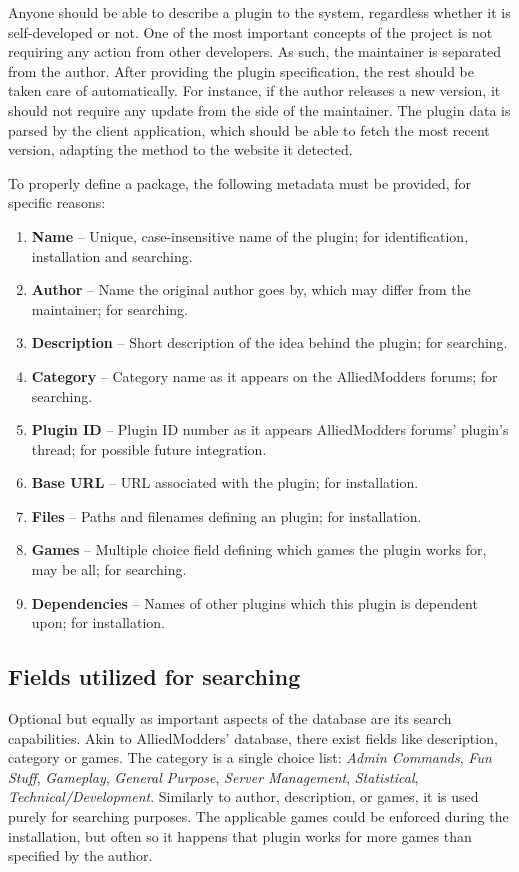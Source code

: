 Anyone should be able to describe a plugin to the system, regardless whether it is self-developed or not.
One of the most important concepts of the project is not requiring any action from other developers.
As such, the maintainer is separated from the author.
After providing the plugin specification, the rest should be taken care of automatically.
For instance, if the author releases a new version, it should not require any update from the side of the maintainer.
The plugin data is parsed by the client application, which should be able to fetch the most recent version, adapting the method to the website it detected.

To properly define a package, the following metadata must be provided, for specific reasons:
\begin{enumerate}
    \item \textbf{Name} -- Unique, case-insensitive name of the plugin; for identification, installation and searching.
    \item \textbf{Author} -- Name the original author goes by, which may differ from the maintainer; for searching.
    \item \textbf{Description} -- Short description of the idea behind the plugin; for searching.
    \item \textbf{Category} -- Category name as it appears on the AlliedModders forums; for searching.
    \item \textbf{Plugin ID} -- Plugin ID number as it appears AlliedModders forums' plugin's thread; for possible future integration.
    \item \textbf{Base URL} -- URL associated with the plugin; for installation.
    \item \textbf{Files} -- Paths and filenames defining an plugin; for installation.
    \item \textbf{Games} -- Multiple choice field defining which games the plugin works for, may be all; for searching.
    \item \textbf{Dependencies} -- Names of other plugins which this plugin is dependent upon; for installation.
\end{enumerate}

\subsection{Fields utilized for searching}

Optional but equally as important aspects of the database are its search capabilities.
Akin to AlliedModders' database, there exist fields like description, category or games.
The category is a single choice list: \textit{Admin Commands}, \textit{Fun Stuff}, \textit{Gameplay}, \textit{General Purpose}, \textit{Server Management}, \textit{Statistical}, \textit{Technical/Development}.
Similarly to author, description, or games, it is used purely for searching purposes.
The applicable games could be enforced during the installation, but often so it happens that plugin works for more games than specified by the author.

